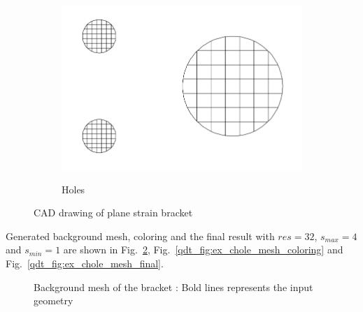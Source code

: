 \begin{figure}[H]
\begin{subfigure}[b]{0.4\linewidth}
{                \includegraphics{quadtree/ex_images/ex_bracket_cad_holes.png}
            }
            \caption{Holes}
        \end{subfigure}
        \caption{CAD drawing of plane strain bracket}
        \label{qdt_fig:ex_bracket_cad}
    \end{figure}
Generated background mesh, coloring and the final result with $res=32$, $s_{max}=4$ and $s_{min}=1$ are shown in Fig.~\ref{qdt_fig:ex_chole_background_mesh}, Fig.~\ref{qdt_fig:ex_chole_mesh_coloring} and Fig.~\ref{qdt_fig:ex_chole_mesh_final}.
\begin{figure}
    \centering
    \caption[Background mesh of the bracket]{Background mesh of the bracket : Bold lines represents the input geometry}
    \label{qdt_fig:ex_chole_background_mesh}
\end{figure}
